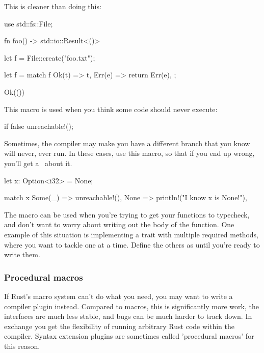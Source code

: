 This is cleaner than doing this:

\begin{rustc}
use std::fs::File;

fn foo() -> std::io::Result<()> {
    let f = File::create("foo.txt");

    let f = match f {
        Ok(t) => t,
        Err(e) => return Err(e),
    };

    Ok(())
}
\end{rustc}


This macro is used when you think some code should never execute:

\begin{rustc}
if false {
    unreachable!();
}
\end{rustc}

Sometimes, the compiler may make you have a different branch that you know will never, ever run. In these cases, use this macro, so 
that if you end up wrong, you'll get a \panic\ about it.

\begin{rustc}
let x: Option<i32> = None;

match x {
    Some(_) => unreachable!(),
    None => println!("I know x is None!"),
}
\end{rustc}


The  macro can be used when you're trying to get your functions to typecheck, and don't want to worry about writing 
out the body of the function. One example of this situation is implementing a trait with multiple required methods, where you want to tackle 
one at a time. Define the others as  until you're ready to write them.

\subsubsection*{Procedural macros}

If Rust's macro system can't do what you need, you may want to write a compiler plugin instead. Compared to  macros, 
this is significantly more work, the interfaces are much less stable, and bugs can be much harder to track down. In exchange you get the 
flexibility of running arbitrary Rust code within the compiler. Syntax extension plugins are sometimes called 'procedural macros' for 
this reason.
